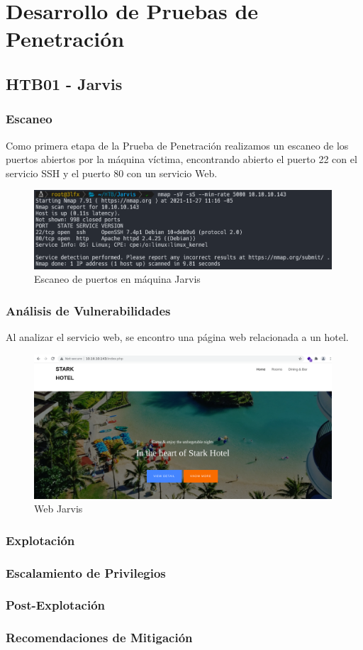 \section{Desarrollo de Pruebas de Penetración}
\subsection{HTB01 - Jarvis}
\subsubsection{Escaneo}
Como primera etapa de la Prueba de Penetración realizamos un escaneo de los puertos abiertos por la máquina víctima, encontrando abierto el puerto 22 con el servicio SSH y el puerto 80 con un servicio Web.
\begin{figure}[H]
    \centering
    \includegraphics[width=0.99\textwidth]{imagenes/nmap_jarvis.png}
    \caption{Escaneo de puertos en máquina Jarvis}
\end{figure}
\subsubsection{Análisis de Vulnerabilidades}
Al analizar el servicio web, se encontro una página web relacionada a un hotel.
\begin{figure}[H]
    \centering
    \includegraphics[width=0.99\textwidth]{imagenes/index_jarvis.png}
    \caption{Web Jarvis}
\end{figure}
\subsubsection{Explotación}
\subsubsection{Escalamiento de Privilegios}
\subsubsection{Post-Explotación}
\subsubsection{Recomendaciones de Mitigación}